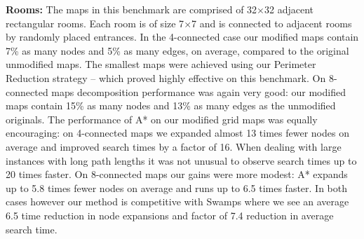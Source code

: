 \textbf{Rooms:}
The maps in this benchmark are comprised of 32$\times$32 adjacent rectangular rooms. Each room is of size 7$\times$7
and is connected to adjacent rooms by randomly placed entrances.
In the 4-connected case our modified maps contain 7\% as many nodes and 5\% as many
edges, on average, compared to the original unmodified maps.
The smallest maps were achieved using our Perimeter Reduction strategy -- which proved highly effective on this
benchmark.
On 8-connected maps decomposition performance was again very good: our modified maps contain 15\% as many nodes and 13\% as 
many edges as the unmodified originals.
The performance of A* on our modified grid maps was equally encouraging: 
on 4-connected maps we expanded almost 13 times fewer nodes on average and improved search times by a factor of 16.
When dealing with large instances with long path lengths it was not unusual to observe search times up to 20 times
faster.
On 8-connected maps our gains were more modest: A* expands up to 5.8 times fewer nodes on average and runs
up to 6.5 times faster. 
In both cases however our method is competitive with Swamps where we see an
average 6.5 time reduction in node expansions and factor of 7.4 reduction in average search
time.






